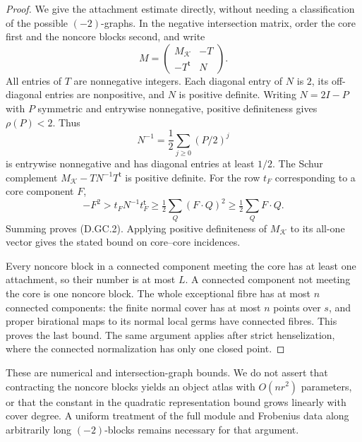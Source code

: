 \begin{proof}
We give the attachment estimate directly, without needing a
classification of the possible $(-2)$-graphs.  In the negative
intersection matrix, order the core first and the noncore
blocks second, and write
\[
                   M=\begin{pmatrix}M_{\mathcal K}&-T\\
                                      -T^{\mathsf t}&N
                      \end{pmatrix}.
\]
All entries of $T$ are nonnegative integers.  Each diagonal
entry of $N$ is $2$, its off-diagonal entries are nonpositive,
and $N$ is positive definite.  Writing $N=2I-P$ with $P$
symmetric and entrywise nonnegative, positive definiteness
gives $\rho(P)<2$.  Thus
\[
             N^{-1}=\frac12\sum_{j\ge0}(P/2)^j
\]
is entrywise nonnegative and has diagonal entries at least
$1/2$.  The Schur complement
$M_{\mathcal K}-TN^{-1}T^{\mathsf t}$ is positive definite.
For the row $t_F$ corresponding to a core component $F$,
\[
     -F^2>t_FN^{-1}t_F^{\mathsf t}
             \ge\tfrac12\sum_Q(F\cdot Q)^2
             \ge\tfrac12\sum_Q F\cdot Q.
\]
Summing proves (D.GC.2).  Applying positive definiteness of
$M_{\mathcal K}$ to its all-one vector gives the stated bound
on core--core incidences.

Every noncore block in a connected component meeting the
core has at least one attachment, so their number is at most
$L$.  A connected component not meeting the core is one
noncore block.  The whole exceptional fibre has at most $n$
connected components: the finite normal cover has at most
$n$ points over $s$, and proper birational maps to its normal
local germs have connected fibres.  This proves the last
bound.  The same argument applies after strict henselization,
where the connected normalization has only one closed point.
\end{proof}

\begin{remark}
These are numerical and intersection-graph bounds.  We do
not assert that contracting the noncore blocks yields an
object atlas with $O(nr^2)$ parameters, or that the constant
in the quadratic representation bound grows linearly with
cover degree.  A uniform treatment of the full module and
Frobenius data along arbitrarily long $(-2)$-blocks remains
necessary for that argument.
\end{remark}
